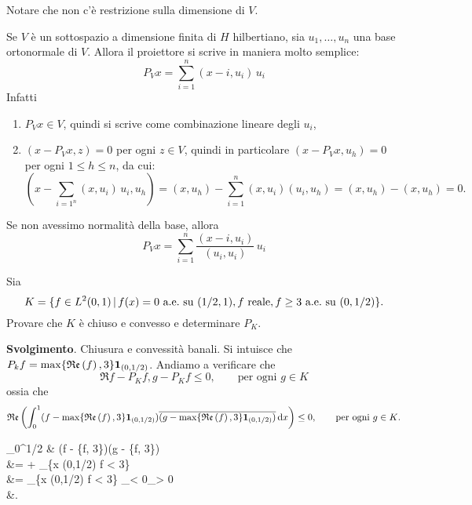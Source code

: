\begin{remark}
	Notare che non c'è restrizione sulla dimensione di $V$.
\end{remark}

\begin{remark}
	Se $V$ è un sottospazio a dimensione finita di $H$ hilbertiano, sia $u_1, \ldots, u_n$ una base ortonormale di $V$. Allora il proiettore si scrive in maniera molto semplice:
	\begin{equation*}
		P_V x = \sum_{i=1}^n (x-i, u_i)\,u_i
	\end{equation*}
	Infatti
	\begin{enumerate}
		\item $P_V x \in V$, quindi si scrive come combinazione lineare degli $u_i$,
		\item $(x-P_V x, z) = 0$ per ogni $z \in V$, quindi in particolare $(x-P_V x, u_h) = 0$ per ogni $1 \leq h \leq n$, da cui:
		\begin{equation*}
			(x- {\textstyle \sum_{i=1^n}} (x,u_i)\,u_i, u_h) = (x, u_h) - \sum_{i=1}^n (x,u_i)(u_i, u_h) = (x,u_h) - (x, u_h) = 0.
		\end{equation*}
	\end{enumerate}
	Se non avessimo normalità della base, allora
	\begin{equation*}
		P_V x = \sum_{i=1}^n \frac{(x-i, u_i)}{(u_i, u_i)}\,u_i
	\end{equation*}
\end{remark}

\begin{exercise}
	Sia
	\begin{equation*}
		K = \{f \in L^2(0,1) \,|\, f(x) = 0 \ \text{a.e.}\ \text{su $(1/2,1)$}, \text{$f$ reale}, f\geq 3 \ \text{a.e.}\ \text{su $(0,1/2)$}\}.
	\end{equation*}
	Provare che $K$ è chiuso e convesso e determinare $P_K$.

	\noindent\textbf{Svolgimento}.
	Chiusura e convessità banali. Si intuisce che $P_k f = \max\{\mathfrak{Re}\left(f\right), 3\}{\boldsymbol{1}}_{(0,1/2)}$. Andiamo a verificare che
	\begin{equation*}
		\Re{f-P_K f, g - P_K f} \leq 0, \qquad \text{per ogni $g \in K$}
	\end{equation*}
	ossia che
	\begin{equation*}
		\mathfrak{Re}\left(\int_0^1 (f- \max\{\mathfrak{Re}\left(f\right), 3\}{\boldsymbol{1}}_{(0,1/2)}) \overline{(g- \max\{\mathfrak{Re}\left(f\right), 3\}{\boldsymbol{1}}_{(0,1/2)})}\,\mathrm{d}x\right) \leq 0, \qquad \text{per ogni $g \in K$}.
	\end{equation*}
	\begin{eqalign*}
		\int_0^{1/2} & (\Re f - \max \{\Re f, 3\})(g - \max\{\Re f, 3\})\,\dx\\
		&=  + \int_{\{x \in (0,1/2) \suchthat \Re f < 3\}} \\
		&= \int_{\{x \in (0,1/2) \suchthat \Re f < 3\}} _{< 0}_{> 0}\,\dx\\
		&.
	\end{eqalign*}
\end{exercise}

